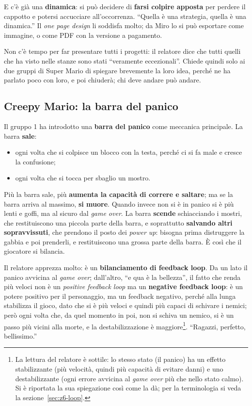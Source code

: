 E c'è già una \textbf{dinamica}: si può decidere di \textbf{farsi colpire apposta}
per perdere il cappotto e potersi accucciare all'occorrenza. ``Quella è una
strategia, quella è una dinamica.'' Il \emph{one page design} li soddisfa molto; da
Miro lo si può esportare come immagine, o come PDF con la versione a pagamento.

Non c'è tempo per far presentare tutti i progetti: il relatore dice che tutti
quelli che ha visto nelle stanze sono stati ``veramente eccezionali''. Chiede quindi
solo ai due gruppi di Super Mario di spiegare brevemente la loro idea, perché ne ha
parlato poco con loro, e poi chiuderà; chi deve andare può andare.

\subsection{Creepy Mario: la barra del panico}

Il gruppo 1 ha introdotto una \textbf{barra del panico} come meccanica principale.
La barra \textbf{sale}:
\begin{itemize}
  \item ogni volta che si colpisce un blocco con la testa, perché ci si fa male e
        cresce la confusione;
  \item ogni volta che si tocca per sbaglio un mostro.
\end{itemize}
Più la barra sale, più \textbf{aumenta la capacità di correre e saltare}; ma se la
barra arriva al massimo, \textbf{si muore}. Quando invece non si è in panico si è più
lenti e goffi, ma al sicuro dal \emph{game over}. La barra \textbf{scende}
schiacciando i mostri, che restituiscono una piccola parte della barra, e soprattutto
\textbf{salvando altri sopravvissuti}, che prendono il posto dei \emph{power up}:
bisogna prima distruggere la gabbia e poi prenderli, e restituiscono una grossa parte
della barra. È così che il giocatore si bilancia.

Il relatore apprezza molto: è un \textbf{bilanciamento di feedback loop}. Da un lato
il panico avvicina al \emph{game over}; dall'altro, ``e qua è la bellezza'', il fatto
che renda più veloci non è un \emph{positive feedback loop} ma un \textbf{negative
feedback loop}: è un potere positivo per il personaggio, ma un feedback negativo,
perché alla lunga stabilizza il gioco, dato che si è più veloci e quindi più capaci
di schivare i nemici; però ogni volta che, da quel momento in poi, non si schiva un
nemico, si è un passo più vicini alla morte, e la destabilizzazione è
maggiore\footnote{La lettura del relatore è sottile: lo stesso stato (il panico) ha
un effetto stabilizzante (più velocità, quindi più capacità di evitare danni) e uno
destabilizzante (ogni errore avvicina al \emph{game over} più che nello stato calmo).
Si è riportata la sua spiegazione così come la dà; per la terminologia si veda la
sezione~\ref{sec:z6-loop}.}. ``Ragazzi, perfetto, bellissimo.''

